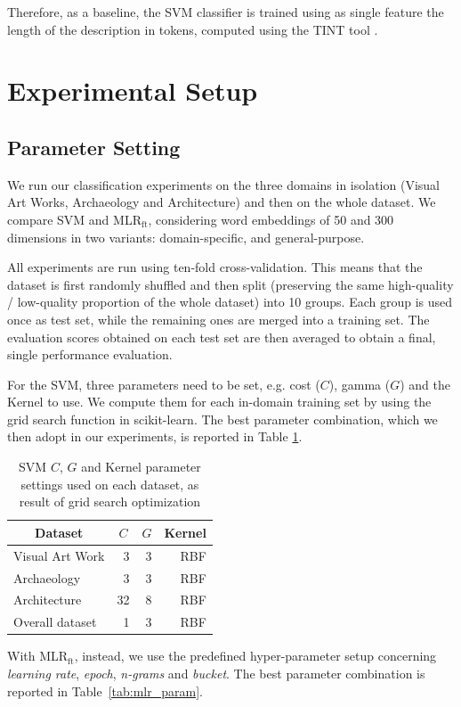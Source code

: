 \documentclass[epsfig,a4paper,12pt,titlepage]{book}
\newcommand{\mlr}{MLR$_\text{ft}$\xspace}
\begin{document}
Therefore, as a baseline, the SVM classifier is trained using as single feature the length of the description in tokens, computed using the TINT tool \cite{DBLP:conf/clic-it/AprosioM18}.   

\section{Experimental Setup}
\label{5.5}

\subsection{Parameter Setting}
We run our classification experiments on the three  domains in isolation (Visual Art Works, Archaeology and Architecture) and then on the whole dataset. We compare SVM and \mlr, considering word embeddings of 50 and 300 dimensions in two variants: domain-specific, and general-purpose.

All experiments are run using ten-fold cross-validation. This means that the dataset is first randomly shuffled and then split (preserving the same high-quality / low-quality proportion of the whole dataset) into 10 groups. Each group is used once as test set, while the remaining ones are merged into a training set. The evaluation scores obtained on each test set are then averaged to obtain a final, single performance evaluation.


For the SVM, three parameters need to be set, e.g. cost ($C$), gamma ($G$) and the Kernel to use. We compute them for each in-domain training set by using the grid search function in scikit-learn. The best parameter combination, which we then adopt in our experiments, is reported in Table \ref{tab:3}. 

\begin{table}[t]

\caption{SVM $C$, $G$ and Kernel parameter settings used on each dataset, as result of grid search optimization}
		\label{tab:3}       %
\centering
\begin{tabular}{|l|r|r|r|} 
\hline
\multicolumn{1}{|c|}{Dataset} & \multicolumn{1}{|c|}{$C$} & \multicolumn{1}{|c|}{$G$} & \multicolumn{1}{|c|}{Kernel}  \\ 
\hline
Visual Art Work             & 3    & 3    & RBF          \\ \hline
Archaeology                 & 3    & 3     & RBF          \\ \hline
Architecture                & 32     & 8     & RBF         \\ \hline
\hline
Overall dataset             & 1    & 3    & RBF           \\\hline
\hline
\end{tabular}

\end{table}
With \mlr, instead, we use the predefined hyper-parameter setup concerning \textit{learning rate}, \textit{epoch}, \textit{n-grams} and \textit{bucket}. The best parameter combination is reported in Table~\ref{tab:mlr_param}. 
\end{document}
